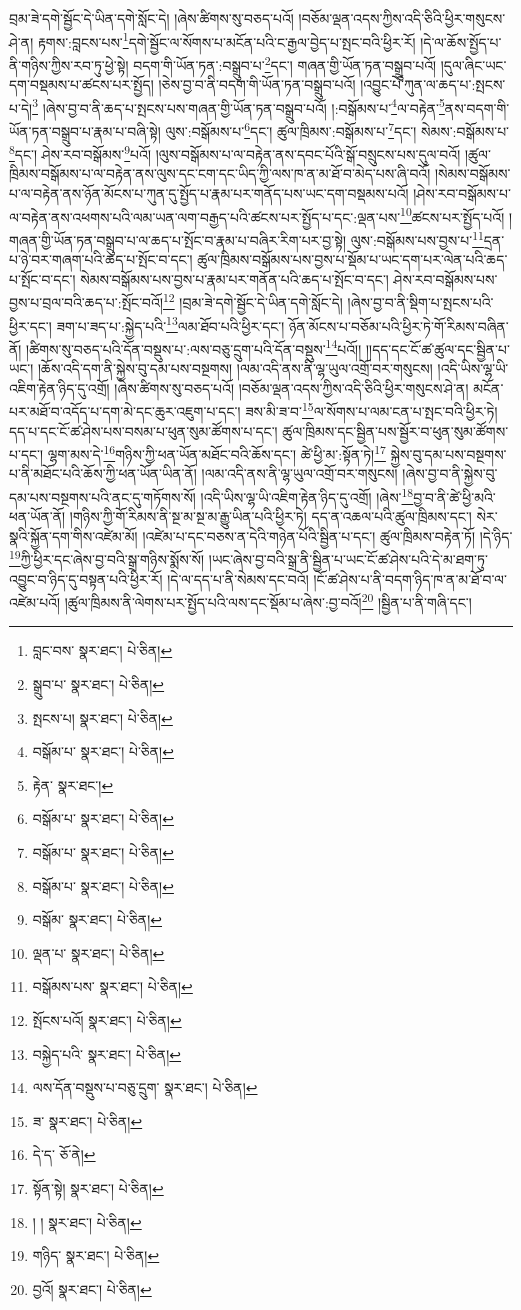 བྲམ་ཟེ་དགེ་སྦྱོང་དེ་ཡིན་དགེ་སློང་དེ། །ཞེས་ཚིགས་སུ་བཅད་པའོ། །བཅོམ་ལྡན་འདས་ཀྱིས་འདི་ཅིའི་ཕྱིར་གསུངས་ཤེ་ན། རྟགས་:བླངས་པས་\footnote{བླང་བས་  སྣར་ཐང་།  པེ་ཅིན། }དགེ་སྦྱོང་ལ་སོགས་པ་མངོན་པའི་ང་རྒྱལ་བྱེད་པ་སྤང་བའི་ཕྱིར་རོ། །དེ་ལ་ཆོས་སྤྱོད་པ་ནི་གཉིས་ཀྱིས་རབ་ཏུ་ཕྱེ་སྟེ། བདག་གི་ཡོན་ཏན་:བསྒྲུབ་པ་\footnote{སྒྲུབ་པ་  སྣར་ཐང་།  པེ་ཅིན། }དང་། གཞན་གྱི་ཡོན་ཏན་བསྒྲུབ་པའོ། །དུལ་ཞིང་ཡང་དག་བསྡམས་པ་ཚངས་པར་སྤྱོད། །ཅེས་བྱ་བ་ནི་བདག་གི་ཡོན་ཏན་བསྒྲུབ་པའོ། །འབྱུང་པོ་ཀུན་ལ་ཆད་པ་:སྤངས་པ་དེ།\footnote{སྤངས་པ།  སྣར་ཐང་།  པེ་ཅིན། } །ཞེས་བྱ་བ་ནི་ཆད་པ་སྤངས་པས་གཞན་གྱི་ཡོན་ཏན་བསྒྲུབ་པའོ། །:བསྒོམས་པ་\footnote{བསྒོམ་པ་  སྣར་ཐང་།  པེ་ཅིན། }ལ་བརྟེན་\footnote{རྟེན་  སྣར་ཐང་། }ནས་བདག་གི་ཡོན་ཏན་བསྒྲུབ་པ་རྣམ་པ་བཞི་སྟེ། ལུས་:བསྒོམས་པ་\footnote{བསྒོམ་པ་  སྣར་ཐང་།  པེ་ཅིན། }དང་། ཚུལ་ཁྲིམས་:བསྒོམས་པ་\footnote{བསྒོམ་པ་  སྣར་ཐང་།  པེ་ཅིན། }དང་། སེམས་:བསྒོམས་པ་\footnote{བསྒོམ་པ་  སྣར་ཐང་།  པེ་ཅིན། }དང་། ཤེས་རབ་བསྒོམས་\footnote{བསྒོམ་  སྣར་ཐང་།  པེ་ཅིན། }པའོ། །ལུས་བསྒོམས་པ་ལ་བརྟེན་ནས་དབང་པོའི་སྒོ་བསྲུངས་པས་དུལ་བའོ། །ཚུལ་ཁྲིམས་བསྒོམས་པ་ལ་བརྟེན་ནས་ལུས་དང་ངག་དང་ཡིད་ཀྱི་ལས་ཁ་ན་མ་ཐོ་བ་མེད་པས་ཞི་བའོ། །སེམས་བསྒོམས་པ་ལ་བརྟེན་ནས་ཉོན་མོངས་པ་ཀུན་དུ་སྤྱོད་པ་རྣམ་པར་གནོད་པས་ཡང་དག་བསྡམས་པའོ། །ཤེས་རབ་བསྒོམས་པ་ལ་བརྟེན་ནས་འཕགས་པའི་ལམ་ཡན་ལག་བརྒྱད་པའི་ཚངས་པར་སྤྱོད་པ་དང་:ལྡན་པས་\footnote{ལྡན་པ་  སྣར་ཐང་།  པེ་ཅིན། }ཚངས་པར་སྤྱོད་པའོ། །གཞན་གྱི་ཡོན་ཏན་བསྒྲུབ་པ་ལ་ཆད་པ་སྤོང་བ་རྣམ་པ་བཞིར་རིག་པར་བྱ་སྟེ། ལུས་:བསྒོམས་པས་བྱས་པ་\footnote{བསྒོམས་པས་  སྣར་ཐང་།  པེ་ཅིན། }དྲན་པ་ཉེ་བར་གཞག་པའི་ཆད་པ་སྤོང་བ་དང་། ཚུལ་ཁྲིམས་བསྒོམས་པས་བྱས་པ་སྡོམ་པ་ཡང་དག་པར་ལེན་པའི་ཆད་པ་སྤོང་བ་དང་། སེམས་བསྒོམས་པས་བྱས་པ་རྣམ་པར་གནོན་པའི་ཆད་པ་སྤོང་བ་དང་། ཤེས་རབ་བསྒོམས་པས་བྱས་པ་བྲལ་བའི་ཆད་པ་:སྤོང་བའོ།\footnote{སྤོངས་པའོ།  སྣར་ཐང་།  པེ་ཅིན། } །བྲམ་ཟེ་དགེ་སྦྱོང་དེ་ཡིན་དགེ་སློང་དེ། །ཞེས་བྱ་བ་ནི་སྡིག་པ་སྤངས་པའི་ཕྱིར་དང་། ཟག་པ་ཟད་པ་:སྐྱེད་པའི་\footnote{བསྐྱེད་པའི་  སྣར་ཐང་།  པེ་ཅིན། }ལམ་ཐོབ་པའི་ཕྱིར་དང་། ཉོན་མོངས་པ་བཅོམ་པའི་ཕྱིར་ཏེ་གོ་རིམས་བཞིན་ནོ། །ཚིགས་སུ་བཅད་པའི་དོན་བསྡུས་པ་:ལས་བཅུ་དྲུག་པའི་དོན་བསྡུས་\footnote{ལས་དོན་བསྡུས་པ་བཅུ་དྲུག་  སྣར་ཐང་།  པེ་ཅིན། }པའོ།། །།དད་དང་ངོ་ཚ་ཚུལ་དང་སྦྱིན་པ་ཡང་། །ཆོས་འདི་དག་ནི་སྐྱེས་བུ་དམ་པས་བསྔགས། །ལམ་འདི་ནས་ནི་ལྷ་ཡུལ་འགྲོ་བར་གསུངས། །འདི་ཡིས་ལྷ་ཡི་འཇིག་རྟེན་ཉིད་དུ་འགྲོ། །ཞེས་ཚིགས་སུ་བཅད་པའོ། །བཅོམ་ལྡན་འདས་ཀྱིས་འདི་ཅིའི་ཕྱིར་གསུངས་ཤེ་ན། མངོན་པར་མཐོ་བ་འདོད་པ་དག་མེ་དང་ཆུར་འཇུག་པ་དང་། ཟས་མི་ཟ་བ་\footnote{ཟ་  སྣར་ཐང་།  པེ་ཅིན། }ལ་སོགས་པ་ལམ་ངན་པ་སྤང་བའི་ཕྱིར་ཏེ། དད་པ་དང་ངོ་ཚ་ཤེས་པས་བསམ་པ་ཕུན་སུམ་ཚོགས་པ་དང་། ཚུལ་ཁྲིམས་དང་སྦྱིན་པས་སྦྱོར་བ་ཕུན་སུམ་ཚོགས་པ་དང་། ལྷག་མས་དེ་\footnote{དེ་ད་  ཅོ་ནེ། }གཉིས་ཀྱི་ཕན་ཡོན་མཐོང་བའི་ཆོས་དང་། ཚེ་ཕྱི་མ་:སྟོན་ཏེ།\footnote{སྟོན་སྟེ།  སྣར་ཐང་།  པེ་ཅིན། } སྐྱེས་བུ་དམ་པས་བསྔགས་པ་ནི་མཐོང་པའི་ཆོས་ཀྱི་ཕན་ཡོན་ཡིན་ནོ། །ལམ་འདི་ནས་ནི་ལྷ་ཡུལ་འགྲོ་བར་གསུངས། །ཞེས་བྱ་བ་ནི་སྐྱེས་བུ་དམ་པས་བསྔགས་པའི་ནང་དུ་གཏོགས་སོ། །འདི་ཡིས་ལྷ་ཡི་འཇིག་རྟེན་ཉིད་དུ་འགྲོ། །ཞེས་\footnote{། །  སྣར་ཐང་།  པེ་ཅིན། }བྱ་བ་ནི་ཚེ་ཕྱི་མའི་ཕན་ཡོན་ནོ། །གཉིས་ཀྱི་གོ་རིམས་ནི་སྔ་མ་སྔ་མ་རྒྱུ་ཡིན་པའི་ཕྱིར་ཏེ། དད་ན་འཆལ་པའི་ཚུལ་ཁྲིམས་དང་། སེར་སྣའི་སྐྱོན་དག་གིས་འཛེམ་མོ། །འཛེམ་པ་དང་བཅས་ན་དེའི་གཉེན་པོའི་སྦྱིན་པ་དང་། ཚུལ་ཁྲིམས་བརྟེན་ཏོ། །དེ་ཉིད་\footnote{གཉིད་  སྣར་ཐང་།  པེ་ཅིན། }ཀྱི་ཕྱིར་དང་ཞེས་བྱ་བའི་སྒྲ་གཉིས་སྨོས་སོ། །ཡང་ཞེས་བྱ་བའི་སྒྲ་ནི་སྦྱིན་པ་ཡང་ངོ་ཚ་ཤེས་པའི་དེ་མ་ཐག་ཏུ་འབྱུང་བ་ཉིད་དུ་བསྟན་པའི་ཕྱིར་རོ། །དེ་ལ་དད་པ་ནི་སེམས་དང་བའོ། །ངོ་ཚ་ཤེས་པ་ནི་བདག་ཉིད་ཁ་ན་མ་ཐོ་བ་ལ་འཛེམ་པའོ། །ཚུལ་ཁྲིམས་ནི་ལེགས་པར་སྤྱོད་པའི་ལས་དང་སྡོམ་པ་ཞེས་:བྱ་བའོ།\footnote{བྱའོ།  སྣར་ཐང་།  པེ་ཅིན། } །སྦྱིན་པ་ནི་གཞི་དང་། 